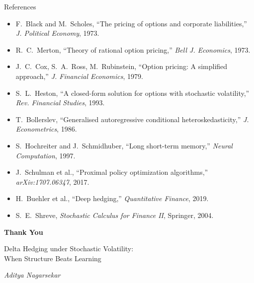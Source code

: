 \documentclass[aspectratio=169,10pt]{beamer}
\begin{document}
\begin{frame}{References}
\small
\begin{itemize}\itemsep3pt
  \item F.~Black and M.~Scholes, ``The pricing of options and corporate liabilities,'' \textit{J. Political Economy}, 1973.
  \item R.~C.~Merton, ``Theory of rational option pricing,'' \textit{Bell J. Economics}, 1973.
  \item J.~C.~Cox, S.~A.~Ross, M.~Rubinstein, ``Option pricing: A simplified approach,'' \textit{J. Financial Economics}, 1979.
  \item S.~L.~Heston, ``A closed-form solution for options with stochastic volatility,'' \textit{Rev. Financial Studies}, 1993.
  \item T.~Bollerslev, ``Generalised autoregressive conditional heteroskedasticity,'' \textit{J. Econometrics}, 1986.
  \item S.~Hochreiter and J.~Schmidhuber, ``Long short-term memory,'' \textit{Neural Computation}, 1997.
  \item J.~Schulman et al., ``Proximal policy optimization algorithms,'' \textit{arXiv:1707.06347}, 2017.
  \item H.~Buehler et al., ``Deep hedging,'' \textit{Quantitative Finance}, 2019.
  \item S.~E.~Shreve, \textit{Stochastic Calculus for Finance II}, Springer, 2004.
\end{itemize}
\end{frame}

\begin{frame}[plain]
\begin{center}
\vspace{1.5cm}
{\LARGE \textbf{Thank You}}

\vspace{1.5cm}
{\large Delta Hedging under Stochastic Volatility:\\[0.3em]
When Structure Beats Learning}

\vspace{1cm}

\vspace{1cm}
\textit{Aditya Nagarsekar}
\end{center}
\end{frame}
\end{document}
